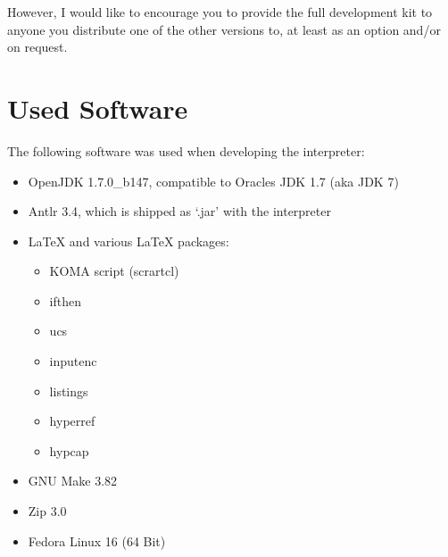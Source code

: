 However, I would like to encourage you to provide the full development kit to anyone you distribute one of the other versions to, at least as an option and\slash{}or on request.

\section{Used Software}

The following software was used when developing the \setlX{} interpreter:

\begin{itemize}
	\item OpenJDK 1.7.0\_b147, compatible to Oracles JDK 1.7 (aka JDK 7)
	\item Antlr 3.4, which is shipped as `.jar' with the interpreter
	\item \LaTeX{} and various \LaTeX{} packages:
		\begin{itemize}
			\item KOMA script (scrartcl)
			\item ifthen
			\item ucs
			\item inputenc
			\item listings
			\item hyperref
			\item hypcap
		\end{itemize}
	\item GNU Make 3.82
	\item Zip 3.0
	\item Fedora Linux 16 (64 Bit)
\end{itemize}



